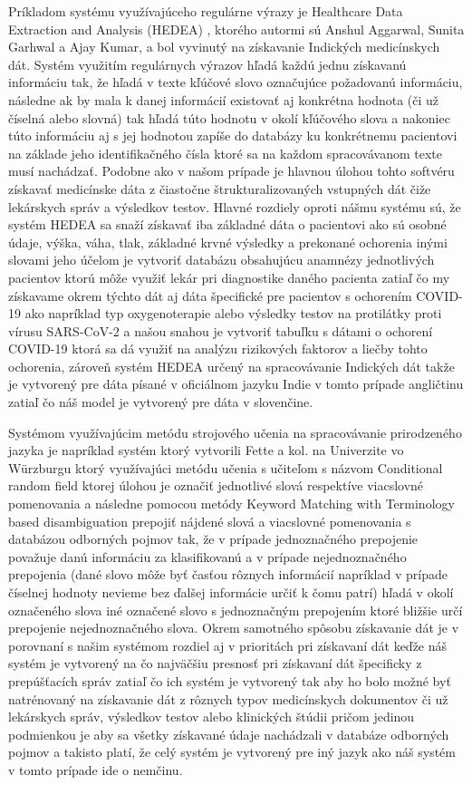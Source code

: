 Príkladom systému využívajúceho regulárne výrazy je Healthcare Data Extraction and Analysis (HEDEA) \cite{hedea}, ktorého
autormi sú Anshul Aggarwal, Sunita Garhwal a Ajay Kumar, 
a bol vyvinutý na získavanie Indických medicínskych dát.
Systém využitím regulárnych výrazov hľadá každú jednu
získavanú informáciu tak, že hľadá v texte kľúčové slovo
označujúce požadovanú informáciu, následne ak by mala 
k danej informácií existovať aj konkrétna hodnota
(či už číselná alebo slovná) tak hľadá túto hodnotu v okolí
kľúčového slova a nakoniec túto informáciu aj 
s jej hodnotou zapíše do databázy ku konkrétnemu 
pacientovi na základe jeho identifikačného
čísla ktoré sa na každom spracovávanom texte musí nachádzať. 
Podobne ako v našom prípade je hlavnou úlohou tohto 
softvéru získavať medicínske dáta z čiastočne štrukturalizovaných
vstupných dát čiže lekárskych správ a výsledkov testov.
Hlavné rozdiely oproti nášmu systému sú, že systém HEDEA
sa snaží získavať iba základné dáta o pacientovi ako sú osobné
údaje, výška, váha, tlak, základné krvné výsledky a 
prekonané ochorenia inými slovami jeho účelom je vytvoriť
databázu obsahujúcu anamnézy jednotlivých pacientov
ktorú môže využiť lekár pri diagnostike daného pacienta
zatiaľ čo my získavame okrem týchto dát aj dáta 
špecifické pre pacientov s ochorením COVID-19 ako
napríklad typ oxygenoterapie alebo výsledky testov
na protilátky proti vírusu SARS-CoV-2 a našou snahou je 
vytvoriť tabuľku s dátami o ochorení COVID-19 ktorá
sa dá využiť na analýzu rizikových faktorov a liečby
tohto ochorenia, zároveň systém HEDEA určený na 
spracovávanie Indických dát
takže je vytvorený pre dáta písané v oficiálnom jazyku
Indie v tomto prípade angličtinu zatiaľ čo náš model
je vytvorený pre dáta v slovenčine.

Systémom využívajúcim metódu strojového učenia na
spracovávanie prirodzeného jazyka je napríklad 
systém ktorý vytvorili Fette a kol. na Univerzite
vo Würzburgu \cite{infExtGer} ktorý využívajúci metódu učenia s 
učiteľom s názvom Conditional random field ktorej úlohou
je označiť jednotlivé slová respektíve viacslovné
pomenovania \cite{CRF} a následne pomocou metódy 
Keyword Matching with Terminology based disambiguation
prepojiť nájdené slová a viacslovné pomenovania s databázou
odborných pojmov tak, že v prípade jednoznačného prepojenie 
považuje danú informáciu za klasifikovanú a v
prípade nejednoznačného prepojenia (dané slovo môže byť časťou
rôznych informácií napríklad v prípade číselnej hodnoty nevieme
bez ďalšej informácie určiť k čomu patrí) hľadá v okolí označeného 
slova iné označené slovo s jednoznačným prepojením ktoré bližšie 
určí prepojenie nejednoznačného slova. Okrem samotného spôsobu
získavanie dát je v porovnaní s našim systémom rozdiel 
aj v prioritách pri získavaní dát keďže náš systém 
je vytvorený na čo najväčšiu presnosť pri získavaní
dát špecificky z prepúšťacích správ zatiaľ čo ich 
systém je vytvorený tak aby ho bolo možné byť natrénovaný na 
získavanie dát z rôznych typov medicínskych dokumentov či už
lekárskych správ, výsledkov testov alebo klinických 
štúdii pričom jedinou podmienkou je aby sa všetky získavané údaje 
nachádzali v databáze odborných pojmov a takisto platí, 
že celý systém je vytvorený 
pre iný jazyk ako náš systém v tomto prípade ide o 
nemčinu. 

